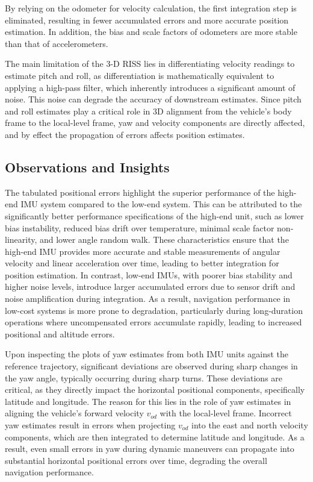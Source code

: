 \documentclass[conference]{IEEEtran}
\begin{document}
By relying on the odometer for velocity calculation, the first integration step is eliminated, resulting in fewer accumulated errors and more accurate position estimation. In addition, the bias and scale factors of odometers are more stable than that of accelerometers.

The main limitation of the 3-D RISS lies in differentiating velocity readings to estimate pitch and roll, as differentiation is mathematically equivalent to applying a high-pass filter, which inherently introduces a significant amount of noise. This noise can degrade the accuracy of downstream estimates. Since pitch and roll estimates play a critical role in 3D alignment from the vehicle’s body frame to the local-level frame, yaw and velocity components are directly affected, and by effect the propagation of errors affects position estimates.

\subsection{Observations and Insights}

The tabulated positional errors highlight the superior performance of the high-end IMU system compared to the low-end system. This can be attributed to the significantly better performance specifications of the high-end unit, such as lower bias instability, reduced bias drift over temperature, minimal scale factor non-linearity, and lower angle random walk. These characteristics ensure that the high-end IMU provides more accurate and stable measurements of angular velocity and linear acceleration over time, leading to better integration for position estimation. In contrast, low-end IMUs, with poorer bias stability and higher noise levels, introduce larger accumulated errors due to sensor drift and noise amplification during integration. As a result, navigation performance in low-cost systems is more prone to degradation, particularly during long-duration operations where uncompensated errors accumulate rapidly, leading to increased positional and altitude errors.

Upon inspecting the plots of yaw estimates from both IMU units against the reference trajectory, significant deviations are observed during sharp changes in the yaw angle, typically occurring during sharp turns. These deviations are critical, as they directly impact the horizontal positional components, specifically latitude and longitude. The reason for this lies in the role of yaw estimates in aligning the vehicle’s forward velocity \( v_{od} \) with the local-level frame. Incorrect yaw estimates result in errors when projecting \( v_{od} \) into the east and north velocity components, which are then integrated to determine latitude and longitude. As a result, even small errors in yaw during dynamic maneuvers can propagate into substantial horizontal positional errors over time, degrading the overall navigation performance.
\end{document}
